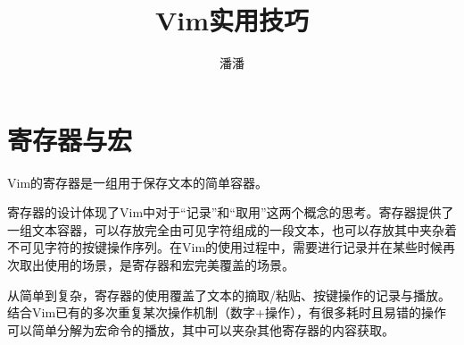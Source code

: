 \documentclass[fontset=windows]{ctexart}
\title{Vim实用技巧}
\author{潘潘}
\begin{document}
\maketitle

\section{寄存器与宏}

Vim的寄存器是一组用于保存文本的简单容器。

寄存器的设计体现了Vim中对于“记录”和“取用”这两个概念的思考。寄存器提供了一组文本容器，可以存放完全由可见字符组成的一段文本，也可以存放其中夹杂着不可见字符的按键操作序列。在Vim的使用过程中，需要进行记录并在某些时候再次取出使用的场景，是寄存器和宏完美覆盖的场景。

从简单到复杂，寄存器的使用覆盖了文本的摘取/粘贴、按键操作的记录与播放。结合Vim已有的多次重复某次操作机制（数字+操作），有很多耗时且易错的操作可以简单分解为宏命令的播放，其中可以夹杂其他寄存器的内容获取。
\end{document}
